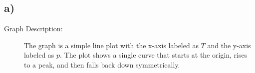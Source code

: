 

\subsection*{a)}

\begin{description}
    \item[Graph Description:] The graph is a simple line plot with the x-axis labeled as $T$ and the y-axis labeled as $p$. The plot shows a single curve that starts at the origin, rises to a peak, and then falls back down symmetrically.
\end{description}